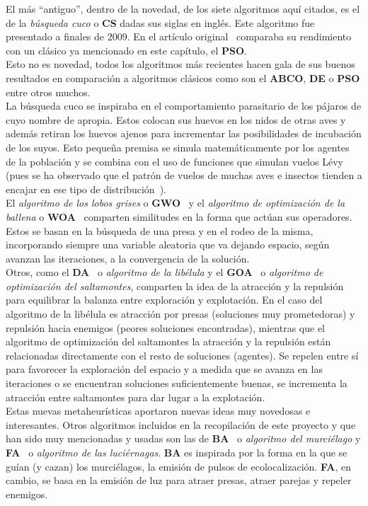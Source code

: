 El más ``antiguo'', dentro de la novedad, de los siete algoritmos aquí citados, es el de la \textit{búsqueda cuco} o \textbf{CS} dadas sus siglas en inglés. Este algoritmo fue presentado a finales de $2009$. En el artículo original~\cite{yang_cuckoo_2010} comparaba su rendimiento con un clásico ya mencionado en este capítulo, el \textbf{PSO}.\\[6pt]
Esto no es novedad, todos los algoritmos más recientes hacen gala de sus buenos resultados en comparación a algoritmos clásicos como son el \textbf{ABCO}, \textbf{DE} o \textbf{PSO} entre otros muchos.\\[6pt]
La búsqueda cuco se inspiraba en el comportamiento parasitario de los pájaros de cuyo nombre de apropia. Estos colocan sus huevos en los nidos de otras aves y además retiran los huevos ajenos para incrementar las posibilidades de incubación de los suyos. Esto pequeña premisa se simula matemáticamente por los agentes de la población y se combina con el uso de funciones que simulan vuelos Lévy (pues se ha observado que el patrón de vuelos de muchas aves e insectos tienden a encajar en ese tipo de distribución~\cite{GUY2008585}).\\[6pt]
El \textit{algoritmo de los lobos grises} o \textbf{GWO}~\cite{mirjalili_grey_2014} y el \textit{algoritmo de optimización de la ballena} o \textbf{WOA}~\cite{mirjalili_whale_2016} comparten similitudes en la forma que actúan sus operadores. Estos se basan en la búsqueda de una presa y en el rodeo de la misma, incorporando siempre una variable aleatoria que va dejando espacio, según avanzan las iteraciones, a la convergencia de la solución.\\[6pt]
Otros, como el \textbf{DA}~\cite{mirjalili_dragonfly_2016} o \textit{algoritmo de la libélula} y el \textbf{GOA}~\cite{saremi_grasshopper_2017} o \textit{algoritmo de optimización del saltamontes}, comparten la idea de la atracción y la repulsión para equilibrar la balanza entre exploración y explotación. En el caso del algoritmo de la libélula es atracción por presas (soluciones muy prometedoras) y repulsión hacia enemigos (peores soluciones encontradas), mientras que el algoritmo de optimización del saltamontes la atracción y la repulsión están relacionadas directamente con el resto de soluciones (agentes). Se repelen entre sí para favorecer la exploración del espacio y a medida que se avanza en las iteraciones o se encuentran soluciones suficientemente buenas, se incrementa la atracción entre saltamontes para dar lugar a la explotación.\\[6pt]
Estas nuevas metaheurísticas aportaron nuevas ideas muy novedosas e interesantes.
Otros algoritmos incluidos en la recopilación de este proyecto y que han sido muy mencionadas y usadas son las de \textbf{BA}~\cite{yang_new_2010} o \textit{algoritmo del murciélago} y \textbf{FA}~\cite{yang_chapter_2014} o \textit{algoritmo de las luciérnagas}. \textbf{BA} es inspirada por la forma en la que se guían (y cazan) los murciélagos, la emisión de pulsos de ecolocalización. \textbf{FA}, en cambio, se basa en la emisión de luz para atraer presas, atraer parejas y repeler enemigos.\\[6pt]

